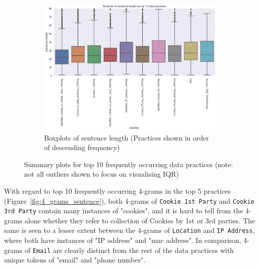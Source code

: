 \begin{figure}[!ht]
\begin{subfigure}[b]{1\linewidth}
	  \includegraphics[width=0.85\linewidth]{figures/eda_boxplots.png}
	  \caption{Boxplots of sentence length (Practices shown in order of descending frequency)}
	  \label{fig:boxplot_top_10}
	\end{subfigure}
	\caption{Summary plots for top 10 frequently occurring data practices (note: not all outliers shown to focus on visualising IQR)}
	\label{fig:eda}
\end{figure}

With regard to top 10 frequently occurring 4-grams in the top 5 practices (Figure~\ref{fig:4_grams_sentence}), both 4-grams of \texttt{Cookie 1st Party} and \texttt{Cookie 3rd Party} contain many instances of "cookies", and it is hard to tell from the 4-grams alone whether they refer to collection of Cookies by 1st or 3rd parties. The same is seen to a lesser extent between the 4-grams of \texttt{Location} and \texttt{IP Address}, where both have instances of "IP address" and "mac address". In comparison, 4-grams of \texttt{Email} are clearly distinct from the rest of the data practices with unique tokens of "email" and "phone number".


